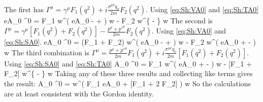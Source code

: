 The first has $	\Gamma^\mu = \gamma^\mu F_1(q^2) + i \frac{\sigma^{\mu\nu}q_\nu}{2m} F_2 (q^2)$.  Using \eqref{eq:Sh:VA0} and \eqref{eq:Sh:TA0}
\beq
	eA_0 \srb  \Gamma^0 \sr = 
		 F_1   w^\dagger \left( 
		eA_0  -  +  
		\right ) w
		- F_2    w^\dagger \left \{
			 -  
	\right \} w
\eeq
The second is	$\Gamma^\mu = \gamma^\mu [F_1(q^2) + F_2(q^2) ]  -  \frac{p^\mu  + p'^\mu }{2m}F_2 (q^2)$.  Using \eqref{eq:Sh:VA0} and \eqref{eq:Sh:SA0}.
\beq
	eA_0 \srb  \Gamma^0 \sr = 
		 (F_1 + F_2)  w^\dagger \left( 
		eA_0  -  +  
		\right ) w
		- F_2   w^\dagger \left( 
		eA_0  +   -  
		\right ) w
\eeq
The third combination is $	\Gamma^\mu = \frac{p^\mu  + p'^\mu }{2m} F_1(q^2) + i \frac{\sigma^{\mu\nu}q_\nu}{2m} [F_1(q^2) + F_2(q^2) ] $.  Using \eqref{eq:Sh:SA0} and \eqref{eq:Sh:TA0}
\beq
	 A_0 \srb  \Gamma^0 \sr = 
		F_1 w^\dagger \left( 
		eA_0  +   -  
		\right ) w
		- [F_1 + F_2] w^\dagger \left \{
			 -  
	\right \} w
\eeq
Taking any of these three results and collecting like terms gives the result:
\beq
		 A_0 \srb  \Gamma^0 \sr = w^\dagger \left(  
			F_1  eA_0
			+ [F_1 + 2 F_2] 
		\right ) w
\eeq
So the calculations are at least consistent with the Gordon identity.

